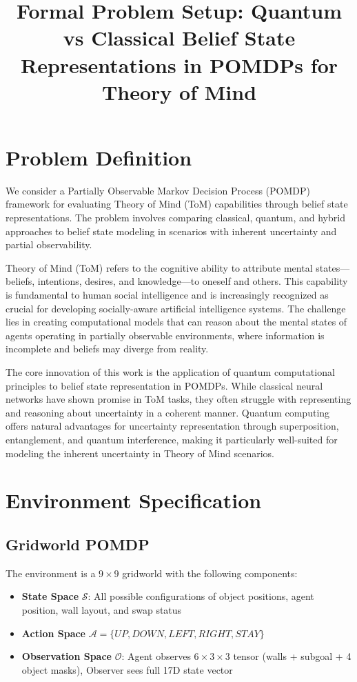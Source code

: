 \documentclass[11pt]{article}
\title{Formal Problem Setup: Quantum vs Classical Belief State Representations in POMDPs for Theory of Mind}
\author{}
\date{}
\begin{document}
\maketitle

\section{Problem Definition}

We consider a Partially Observable Markov Decision Process (POMDP) framework for evaluating Theory of Mind (ToM) capabilities through belief state representations. The problem involves comparing classical, quantum, and hybrid approaches to belief state modeling in scenarios with inherent uncertainty and partial observability.

Theory of Mind (ToM) refers to the cognitive ability to attribute mental states—beliefs, intentions, desires, and knowledge—to oneself and others. This capability is fundamental to human social intelligence and is increasingly recognized as crucial for developing socially-aware artificial intelligence systems. The challenge lies in creating computational models that can reason about the mental states of agents operating in partially observable environments, where information is incomplete and beliefs may diverge from reality.

The core innovation of this work is the application of quantum computational principles to belief state representation in POMDPs. While classical neural networks have shown promise in ToM tasks, they often struggle with representing and reasoning about uncertainty in a coherent manner. Quantum computing offers natural advantages for uncertainty representation through superposition, entanglement, and quantum interference, making it particularly well-suited for modeling the inherent uncertainty in Theory of Mind scenarios.

\section{Environment Specification}

\subsection{Gridworld POMDP}
The environment is a $9 \times 9$ gridworld with the following components:
\begin{itemize}
    \item \textbf{State Space} $\mathcal{S}$: All possible configurations of object positions, agent position, wall layout, and swap status
    \item \textbf{Action Space} $\mathcal{A} = \{UP, DOWN, LEFT, RIGHT, STAY\}$
    \item \textbf{Observation Space} $\mathcal{O}$: Agent observes $6 \times 3 \times 3$ tensor (walls + subgoal + 4 object masks), Observer sees full 17D state vector
\end{itemize}
\end{document}
